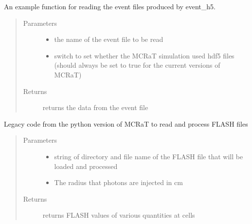 \documentclass[letterpaper,10pt,english]{sphinxmanual}
\begin{document}
\begin{fulllineitems}
\label{\detokenize{mclib:mclib.read_event_file}}
An example function for reading the event files produced by event\_h5.
\begin{quote}\begin{description}
\item[{Parameters}] \leavevmode\begin{itemize}
\item {} 
 \textendash{} the name of the event file to be read

\item {} 
 \textendash{} switch to set whether the MCRaT simulation used hdf5 files (should always be set to true for the current versions of MCRaT)

\end{itemize}

\item[{Returns}] \leavevmode
returns the data from the event file

\end{description}\end{quote}

\end{fulllineitems}


\begin{fulllineitems}
\label{\detokenize{mclib:mclib.readanddecimate}}
Legacy code from the python version of MCRaT to read and process FLASH files
\begin{quote}\begin{description}
\item[{Parameters}] \leavevmode\begin{itemize}
\item {} 
 \textendash{} string of directory and file name of the FLASH file that will be loaded and processed

\item {} 
 \textendash{} The radius that photons are injected in cm

\end{itemize}

\item[{Returns}] \leavevmode
returns FLASH values of various quantities at cells

\end{description}\end{quote}

\end{fulllineitems}
\end{document}
